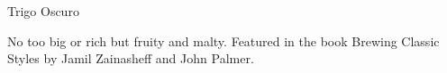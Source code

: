 \begin{recipe}{Trigo Oscuro} %

\begin{aboutblock}
No too big or rich but fruity and malty. Featured in the book Brewing Classic
Styles by Jamil Zainasheff and John Palmer. \sourceaha
\end{aboutblock}


\begin{methodandtiming}

\begin{mashsteps}
\end{mashsteps}

\begin{fermentationsteps}
\end{fermentationsteps}

\end{methodandtiming}

\recipebreak

\begin{ingredientsblock}

\begin{malts}
\end{malts}

\begin{hops}
\end{hops}


\end{ingredientsblock}

\end{recipe}
